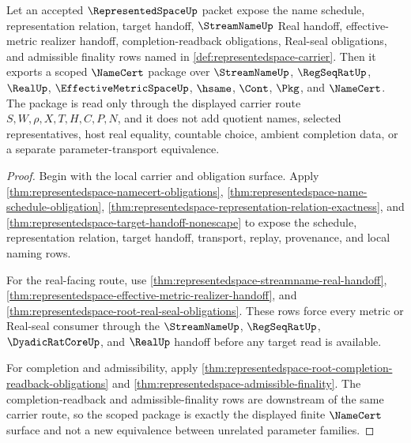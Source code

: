 \begin{theorem}
\label{thm:representedspace-scoped-package}
Let an accepted $\RepresentedSpaceUp$ packet expose the name schedule, representation relation, target handoff, $\StreamNameUp$ Real handoff, effective-metric realizer handoff, completion-readback obligations, Real-seal obligations, and admissible finality rows named in \autoref{def:representedspace-carrier}. Then it exports a scoped $\NameCert$ package over $\StreamNameUp$, $\RegSeqRatUp$, $\RealUp$, $\EffectiveMetricSpaceUp$, $\hsame$, $\Cont$, $\Pkg$, and $\NameCert$. The package is read only through the displayed carrier route $S,W,\rho,X,T,H,C,P,N$, and it does not add quotient names, selected representatives, host real equality, countable choice, ambient completion data, or a separate parameter-transport equivalence.
\end{theorem}
\begin{proof}
Begin with the local carrier and obligation surface. Apply \autoref{thm:representedspace-namecert-obligations}, \autoref{thm:representedspace-name-schedule-obligation}, \autoref{thm:representedspace-representation-relation-exactness}, and \autoref{thm:representedspace-target-handoff-nonescape} to expose the schedule, representation relation, target handoff, transport, replay, provenance, and local naming rows.

For the real-facing route, use \autoref{thm:representedspace-streamname-real-handoff}, \autoref{thm:representedspace-effective-metric-realizer-handoff}, and \autoref{thm:representedspace-root-real-seal-obligations}. These rows force every metric or Real-seal consumer through the $\StreamNameUp$, $\RegSeqRatUp$, $\DyadicRatCoreUp$, and $\RealUp$ handoff before any target read is available.

For completion and admissibility, apply \autoref{thm:representedspace-root-completion-readback-obligations} and \autoref{thm:representedspace-admissible-finality}. The completion-readback and admissible-finality rows are downstream of the same carrier route, so the scoped package is exactly the displayed finite $\NameCert$ surface and not a new equivalence between unrelated parameter families.
\end{proof}

